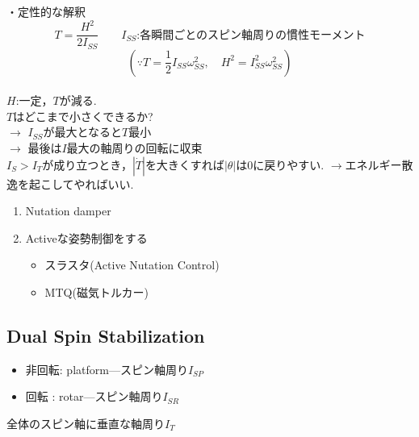 \documentclass[class=article, crop=false, dvipdfmx]{standalone}
\begin{document}
\noindent
・定性的な解釈\\
\[ T=\frac{H^2}{2I_{SS}} \qquad I_{SS}\text{:各瞬間ごとのスピン軸周りの慣性モーメント} \]
$$(\because T=\frac{1}{2}I_{SS}\omega_{SS}^2,\quad H^2=I^2_{SS}\omega^2_{SS})$$\\
$H$:一定，$T$が減る.\\
\qquad $T$はどこまで小さくできるか?\\
$\rightarrow$ $I_{SS}$が最大となると$T$最小\\
$\rightarrow$ 最後は$I$最大の軸周りの回転に収束\\
$I_S>I_T$が成り立つとき，$|\dot{T}|$を大きくすれば$|\theta|$は0に戻りやすい.
$\rightarrow$エネルギー散逸を起こしてやればいい.
\begin{enumerate}
\item Nutation damper
\begin{center}

\end{center}

\item Activeな姿勢制御をする
\begin{itemize}
\item スラスタ(Active Nutation Control)
\item MTQ(磁気トルカー)
\end{itemize}
\end{enumerate}



\subsection{Dual Spin Stabilization}
\begin{itemize}
\item 非回転: platform---スピン軸周り$I_{SP}$
\item 回転 : rotar---スピン軸周り$I_{SR}$
\end{itemize}

全体のスピン軸に垂直な軸周り$I_T$
\end{document}
